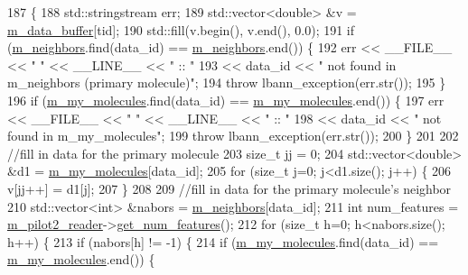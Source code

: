 \begin{DoxyCode}
187                                                                                             \{
188   std::stringstream err;
189   std::vector<double> &v = \hyperlink{classlbann_1_1data__store__pilot2__molecular_aad14735a82ce4cdcb153fcca94cd2b41}{m\_data\_buffer}[tid];
190   std::fill(v.begin(), v.end(), 0.0);
191   \textcolor{keywordflow}{if} (\hyperlink{classlbann_1_1data__store__pilot2__molecular_a567c6bcdfab6f9248f3c320d505861bc}{m\_neighbors}.find(data\_id) == \hyperlink{classlbann_1_1data__store__pilot2__molecular_a567c6bcdfab6f9248f3c320d505861bc}{m\_neighbors}.end()) \{
192     err << \_\_FILE\_\_ << \textcolor{stringliteral}{" "} << \_\_LINE\_\_ << \textcolor{stringliteral}{" :: "}
193         << data\_id << \textcolor{stringliteral}{" not found in m\_neighbors (primary molecule)"};
194     \textcolor{keywordflow}{throw} lbann\_exception(err.str());
195   \}
196   \textcolor{keywordflow}{if} (\hyperlink{classlbann_1_1data__store__pilot2__molecular_a67fb9174cecff931f61e7f6ca000315b}{m\_my\_molecules}.find(data\_id) == \hyperlink{classlbann_1_1data__store__pilot2__molecular_a67fb9174cecff931f61e7f6ca000315b}{m\_my\_molecules}.end()) \{
197     err << \_\_FILE\_\_ << \textcolor{stringliteral}{" "} << \_\_LINE\_\_ << \textcolor{stringliteral}{" :: "}
198         << data\_id << \textcolor{stringliteral}{" not found in m\_my\_molecules"};
199     \textcolor{keywordflow}{throw} lbann\_exception(err.str());
200   \}
201 
202   \textcolor{comment}{//fill in data for the primary molecule}
203   \textcolor{keywordtype}{size\_t} jj = 0;
204   std::vector<double> &d1 = \hyperlink{classlbann_1_1data__store__pilot2__molecular_a67fb9174cecff931f61e7f6ca000315b}{m\_my\_molecules}[data\_id];
205   \textcolor{keywordflow}{for} (\textcolor{keywordtype}{size\_t} j=0; j<d1.size(); j++) \{
206     v[jj++] = d1[j];
207   \}
208 
209   \textcolor{comment}{//fill in data for the primary molecule's neighbor}
210   std::vector<int> &nabors = \hyperlink{classlbann_1_1data__store__pilot2__molecular_a567c6bcdfab6f9248f3c320d505861bc}{m\_neighbors}[data\_id];
211   \textcolor{keywordtype}{int} num\_features = \hyperlink{classlbann_1_1data__store__pilot2__molecular_a1875ae12fe7c2b11818ddb3fecff9f72}{m\_pilot2\_reader}->\hyperlink{classlbann_1_1pilot2__molecular__reader_ad4fcb0da3f6964cbe24de4feac3f5f4a}{get\_num\_features}();
212   \textcolor{keywordflow}{for} (\textcolor{keywordtype}{size\_t} h=0; h<nabors.size(); h++) \{
213     \textcolor{keywordflow}{if} (nabors[h] != -1) \{
214       \textcolor{keywordflow}{if} (\hyperlink{classlbann_1_1data__store__pilot2__molecular_a67fb9174cecff931f61e7f6ca000315b}{m\_my\_molecules}.find(data\_id) == \hyperlink{classlbann_1_1data__store__pilot2__molecular_a67fb9174cecff931f61e7f6ca000315b}{m\_my\_molecules}.end()) \{

\end{DoxyCode}
